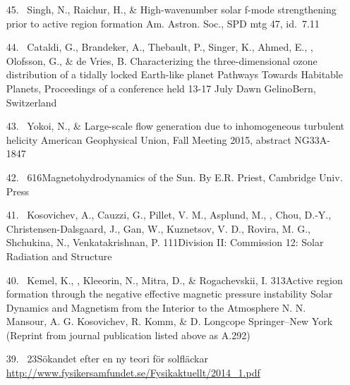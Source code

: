 \begin{itemize}
\item[{45.}~]
Singh, N., Raichur, H., \& \Brandenburg{}
{High-wavenumber solar f-mode strengthening prior to active region formation}
{Am. Astron. Soc., SPD mtg 47, id.\ 7.11}

\item[{44.}~]
Cataldi, G., Brandeker, A., Thebault, P., Singer, K., Ahmed, E., \Brandenburg, Olofsson, G., \& de Vries, B.
{Characterizing the three-dimensional ozone distribution of a tidally locked Earth-like planet}
{Pathways Towards Habitable Planets, Proceedings of a conference held 13-17 July}
{Dawn Gelino}{Bern, Switzerland}

\item[{43.}~]
Yokoi, N., \& \Brandenburg{}
{Large-scale flow generation due to inhomogeneous turbulent helicity}
{American Geophysical Union, Fall Meeting 2015, abstract NG33A-1847}

\item[{42.}~]
\Brandenburg{}
{616}{Magnetohydrodynamics of the Sun. By E.R. Priest, Cambridge Univ. Press}

\item[{41.}~]
Kosovichev, A., Cauzzi, G., Pillet, V. M., Asplund, M., \Brandenburg, Chou, D.-Y., Christensen-Dalsgaard, J., Gan, W., Kuznetsov, V. D., Rovira, M. G., Shchukina, N., Venkatakrishnan, P.
{111}{Division II: Commission 12: Solar Radiation and Structure}

\item[{40.}~]
Kemel, K., \Brandenburg, Kleeorin, N., Mitra, D., \& Rogachevskii, I.
{313}{Active region formation through the negative effective magnetic pressure instability}
{Solar Dynamics and Magnetism from the Interior to the Atmosphere}
{N. N. Mansour, A. G. Kosovichev, R. Komm, \& D. Longcope}
{Springer--New York}
(Reprint from journal publication listed above as A.292)

\item[{39.}~]
\Brandenburg{}
{23}{S\"okandet efter en ny teori f\"or solfl\"ackar}\\
\url{http://www.fysikersamfundet.se/Fysikaktuellt/2014_1.pdf}


\end{itemize}
